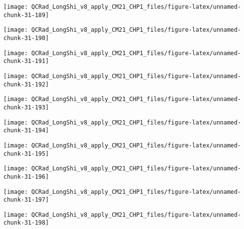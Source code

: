 \documentclass[
  10pt,
  a4paper,oneside]{article}
\begin{document}
\begin{center}\texttt{[image: QCRad\_LongShi\_v8\_apply\_CM21\_CHP1\_files/figure-latex/unnamed-chunk-31-189]} \end{center}

\begin{center}\texttt{[image: QCRad\_LongShi\_v8\_apply\_CM21\_CHP1\_files/figure-latex/unnamed-chunk-31-190]} \end{center}

\begin{center}\texttt{[image: QCRad\_LongShi\_v8\_apply\_CM21\_CHP1\_files/figure-latex/unnamed-chunk-31-191]} \end{center}

\begin{center}\texttt{[image: QCRad\_LongShi\_v8\_apply\_CM21\_CHP1\_files/figure-latex/unnamed-chunk-31-192]} \end{center}

\begin{center}\texttt{[image: QCRad\_LongShi\_v8\_apply\_CM21\_CHP1\_files/figure-latex/unnamed-chunk-31-193]} \end{center}

\begin{center}\texttt{[image: QCRad\_LongShi\_v8\_apply\_CM21\_CHP1\_files/figure-latex/unnamed-chunk-31-194]} \end{center}

\begin{center}\texttt{[image: QCRad\_LongShi\_v8\_apply\_CM21\_CHP1\_files/figure-latex/unnamed-chunk-31-195]} \end{center}

\begin{center}\texttt{[image: QCRad\_LongShi\_v8\_apply\_CM21\_CHP1\_files/figure-latex/unnamed-chunk-31-196]} \end{center}

\begin{center}\texttt{[image: QCRad\_LongShi\_v8\_apply\_CM21\_CHP1\_files/figure-latex/unnamed-chunk-31-197]} \end{center}

\begin{center}\texttt{[image: QCRad\_LongShi\_v8\_apply\_CM21\_CHP1\_files/figure-latex/unnamed-chunk-31-198]} \end{center}
\end{document}
